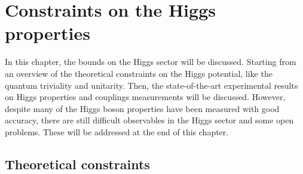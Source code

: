 \chapter{Constraints on the Higgs properties }\label{chap:HiggsConstr}
In this chapter, the bounds on the Higgs sector will be discussed. Starting from an overview of the theoretical constraints on the Higgs potential, like the quantum triviality and unitarity. Then, the state-of-the-art experimental results on Higgs properties and couplings measurements will be discussed. However, despite many of the Higgs boson properties have been measured with good accuracy, there are still difficult observables in the Higgs sector and some open problems. These will be addressed at the end of this chapter.   
\section{Theoretical constraints}

